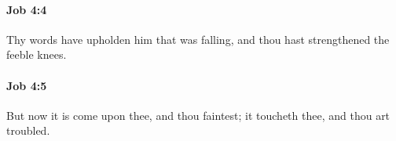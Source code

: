		\paragraph{Job 4:4} %
			\label{JOB-4-4}

			Thy words have upholden him that was falling, and thou hast strengthened the feeble knees.


		\paragraph{Job 4:5} %
			\label{JOB-4-5}

			But now it is come upon thee, and thou faintest; it toucheth thee, and thou art troubled.


